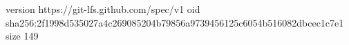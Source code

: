 version https://git-lfs.github.com/spec/v1
oid sha256:2f1998d535027a4c269085204b79856a9739456125c6054b516082dbcec1c7e1
size 149
